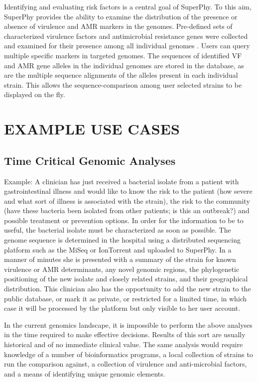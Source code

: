 \documentclass[a4paper,twoside]{article}
\begin{document}
Identifying and evaluating risk factors is a central goal of SuperPhy. To this aim, SuperPhy provides the ability to examine the distribution of the presence or absence of virulence and AMR markers in the genomes.  Pre-defined sets of characterized virulence factors and antimicrobial resistance genes were collected and examined for their presence among all individual genomes \cite{mcarthur2012card,chen2012vfdb,chen2005vfdb}. Users can query multiple specific markers in targeted genomes. The sequences of identified VF and AMR gene alleles in the individual genomes are stored in the database, as are the multiple sequence alignments of the alleles present in each individual strain. This allows the sequence-comparison among user selected strains to be displayed on the fly. 

\section{\uppercase{Example Use Cases}}
\label{sec:cases}
\subsection{Time Critical Genomic Analyses}
Example: A clinician has just received a bacterial isolate from a patient with gastrointestinal illness and would like to know the risk to the patient (how severe and what sort of illness is associated with the strain), the risk to the community (have these bacteria been isolated from other patients; is this an outbreak?) and possible treatment or prevention options. In order for the information to be to useful, the bacterial isolate must be characterized as soon as possible. The genome sequence is determined in the hospital using a distributed sequencing platform such as the MiSeq or IonTorrent and uploaded to SuperPhy. In a manner of minutes she is presented with a summary of the strain for known virulence or AMR determinants, any novel genomic regions, the phylogenetic positioning of the new isolate and closely related strains, and their geographical distribution. This clinician also has the opportunity to add the new strain to the public database, or mark it as private, or restricted for a limited time, in which case it will be processed by the platform but only visible to her user account.

In the current genomics landscape, it is impossible to perform the above analyses in the time required to make effective decisions. Results of this sort are usually historical and of no immediate clinical value. The same analysis would require knowledge of a number of bioinformatics programs, a local collection of strains to run the comparison against, a collection of virulence and anti-microbial factors, and a means of identifying unique genomic elements.
\end{document}
